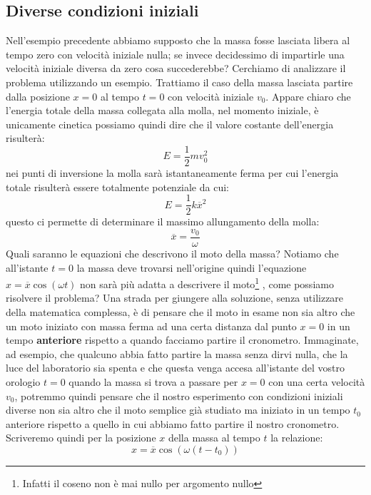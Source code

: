 \documentclass[a4paper,10pt,oneside]{article}
\begin{document}
\subsection*{Diverse condizioni iniziali}
Nell'esempio precedente abbiamo supposto che la massa fosse lasciata libera al tempo zero con velocità iniziale nulla; se invece decidessimo di impartirle una velocità iniziale diversa da zero cosa succederebbe? Cerchiamo di analizzare il problema utilizzando un esempio. Trattiamo il caso della massa lasciata partire dalla posizione $x=0$ al tempo $t=0$ con velocità iniziale $v_0$. Appare chiaro che l'energia totale della massa collegata  alla molla, nel momento iniziale, è unicamente cinetica possiamo quindi dire che il valore costante dell'energia risulterà:
\begin{equation}
E=\frac 1 2 mv_0^2
\end{equation}
nei punti di inversione la molla sarà istantaneamente ferma per cui l'energia totale risulterà essere totalmente potenziale da cui:
\begin{equation}
 E=\frac 1 2 k \overline x^2
\end{equation}
questo ci permette di determinare il massimo allungamento della molla:
\begin{equation}
 \overline x=\frac{v_0}{\omega}
\end{equation}
Quali saranno le equazioni che descrivono il moto della massa? Notiamo che all'istante $t=0$ la massa deve trovarsi nell'origine quindi l'equazione $x=\overline x\cos(\omega t)$ non sarà più adatta a descrivere il moto\footnote{Infatti il coseno non è mai nullo per argomento nullo} , come possiamo risolvere il problema? Una strada per giungere alla soluzione, senza utilizzare della matematica complessa, è di pensare che il moto in esame non sia altro che un moto iniziato con massa ferma ad una certa distanza dal punto $x=0$ in un tempo \textbf{anteriore} rispetto a quando facciamo partire il cronometro. Immaginate, ad esempio, che qualcuno abbia fatto partire la massa senza dirvi nulla, che la luce del laboratorio sia spenta e che questa venga accesa all'istante del vostro orologio $t=0$  quando la massa si trova a passare per $x=0$ con una certa velocità $v_0$, potremmo quindi pensare che il nostro esperimento con condizioni iniziali diverse non sia altro che il moto semplice già studiato ma iniziato in un tempo $t_0$ anteriore rispetto a quello in cui abbiamo fatto partire il nostro cronometro.
Scriveremo quindi per la posizione $x$ della massa al tempo $t$ la relazione:
\begin{equation}\label{mot_trasl}
 x=\overline x\cos(\omega(t-t_0))
\end{equation}
\end{document}
